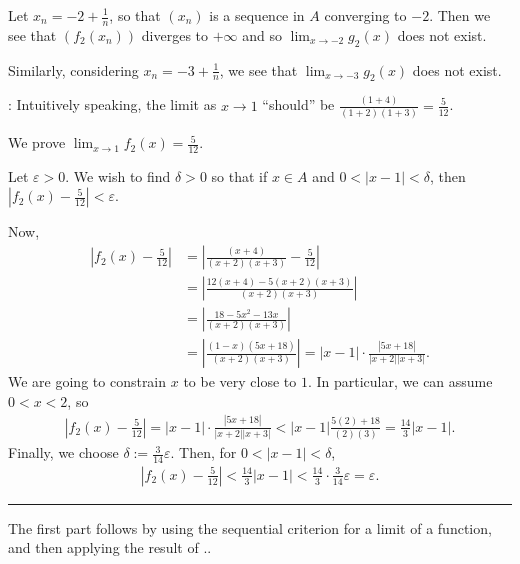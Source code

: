 \documentclass[letterpaper,10pt,english]{jupyterBook}
\begin{document}
\sphinxAtStartPar
Let \(x_n=-2 + \frac{1}{n}\), so that \((x_n)\) is a sequence in \(A\) converging to \(-2\). Then we see that \((f_2(x_n))\) diverges to \(+\infty\) and so \(\lim_{x \rightarrow -2}g_{2}(x)\)  does not exist.

\sphinxAtStartPar
Similarly, considering \(x_n=-3 + \frac{1}{n}\),  we see that \(\lim_{x \rightarrow -3}g_{2}(x)\) does not exist.

\sphinxAtStartPar
{}: 
Intuitively speaking, the limit as \(x\rightarrow 1\) “should” be \(\frac{(1 + 4)}{(1 + 2)(1 + 3)}=\frac{5}{12}\).

\sphinxAtStartPar
We prove \(\lim_{x\rightarrow 1}f_2(x) = \frac{5}{12}\).

\sphinxAtStartPar
Let \(\varepsilon>0\). We wish to find \(\delta>0\) so that if \(x\in A\) and \(0<|x-1|<\delta\), then \(\left|f_2(x)-\frac{5}{12}\right| <\varepsilon\).

\sphinxAtStartPar
Now,
\begin{align*}
\left|f_2(x)-\frac{5}{12}\right| &= \left|\frac{(x + 4)}{(x + 2)(x + 3)}-\frac{5}{12}\right| \\
&= \left|\frac{12(x+4)-5(x+2)(x+3)}{(x+2)(x+3)}\right| \\
&= \left|\frac{18-5x^2-13x}{(x+2)(x+3)}\right| \\
&= \left|\frac{(1-x)(5x+18)}{(x+2)(x+3)}\right|  = |x-1|\cdot\frac{|5x+18|}{|x+2||x+3|}.
\end{align*}
\sphinxAtStartPar
We are going to constrain \(x\) to be very close to \(1\). In particular, we can assume \(0<x<2\), so
\begin{equation*}
\begin{split}
\left|f_2(x)-\frac{5}{12}\right| =|x-1|\cdot\frac{|5x+18|}{|x+2||x+3|} < |x-1| \frac{5(2)+18}{(2)(3)} = \frac{14}{3}|x-1|.
\end{split}
\end{equation*}
\sphinxAtStartPar
Finally, we choose \(\delta:= \frac{3}{14}\varepsilon\). Then, for \(0<|x-1|< \delta\),
\begin{equation*}
\begin{split}
\left|f_2(x)-\frac{5}{12}\right| <  \frac{14}{3}|x-1| <  \frac{14}{3}\cdot \frac{3}{14}\varepsilon = \varepsilon.
\end{split}
\end{equation*}

\bigskip\hrule\bigskip


\sphinxAtStartPar
{\hyperref[\detokenize{Problems:id5}]{}} The first part follows by using the sequential criterion for a limit of a function, and then applying the result of {\hyperref[\detokenize{Problems:p4}]{}}..
\end{document}
